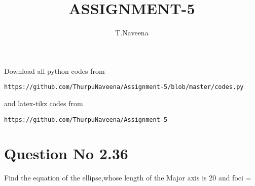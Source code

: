 \documentclass[journal,12pt,twocolumn]{IEEEtran}
\begin{document}
     \def\centbox#1{\makebox[0in]{#1}}
     \def\topbox#1{\raisebox{-\baselineskip}[0in][0in]{#1}}
     \def\midbox#1{\raisebox{-0.5\baselineskip}[0in][0in]{#1}}
\vspace{3cm}
\title{ASSIGNMENT-5}
\author{T.Naveena}
\maketitle
\newpage
\bigskip
\renewcommand{\thefigure}{\theenumi}
\renewcommand{\thetable}{\theenumi}
Download all python codes from 
\begin{lstlisting}
https://github.com/ThurpuNaveena/Assignment-5/blob/master/codes.py
\end{lstlisting}
%
and latex-tikz codes from 
%
\begin{lstlisting}
https://github.com/ThurpuNaveena/Assignment-5
\end{lstlisting}
%
\section{Question No 2.36}
Find the equation of the ellipse,whose length of the Major axis is 20 and foci =
%
\end{document}
